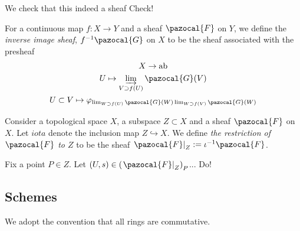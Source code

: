 \begin{remark}
    We check that this indeed a sheaf {\Large Check!}
\end{remark}
\begin{definition}
    For a continuous map $f : X\rightarrow Y$ and a sheaf $\pazocal{F}$ on $Y$, we define the \emph{inverse image sheaf}, $f^{-1}\pazocal{G}$ on $X$ to be the sheaf associated with the presheaf
    \begin{gather*}
        X\rightarrow \mathrm{ab}\\
        U\mapsto \varinjlim_{V\supset f(U)}\pazocal{G}(V)\\
        U\subset V\mapsto \varphi_{\lim_{W\supset f(U)}\pazocal{G}(W)\lim_{W\supset f(V)}\pazocal{G}(W)}
    \end{gather*}
\end{definition}
\begin{definition}
    Consider a topological space $X$, a subspace $Z\subset X$ and a sheaf $\pazocal{F}$ on $X$. Let $iota$ denote the inclusion map $Z\hookrightarrow X$. We define \emph{the restriction of $\pazocal{F}$ to $Z$} to be the sheaf $\left.\pazocal{F}\right|_{Z}:= \iota^{-1}\pazocal{F}$.
\end{definition}
\begin{remark}
    Fix a point $P\in Z$. Let $(U,s)\in \left(\left. \pazocal{F}\right|_Z\right)_P$... {\Large Do!}
\end{remark}
\subsection{Schemes}
We adopt the convention that all rings are commutative.
